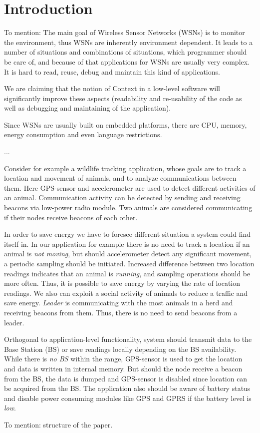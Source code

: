 \section{Introduction} To mention: The main goal of Wireless Sensor Networks
(WSNs) is to monitor the environment, thus WSNs are inherently environment
dependent. It leads to a number of situations and combinations of situations,
which programmer should be care of, and because of that applications for WSNs
are usually very complex. It is hard to read, reuse, debug and maintain this
kind of applications.

We are claiming that the notion of Context in a low-level software will
significantly improve these aspects (readability and re-usability of the code as
well as debugging and maintaining of the application).

Since WSNs are usually built on embedded platforms, there are CPU, memory,
energy consumption and even language restrictions.

...

Consider for example a wildlife tracking application\cite{pasztor10}, whose
goals are to track a location and movement of animals, and to analyze
communications between them. Here GPS-sensor and accelerometer are used to
detect different activities of an animal. Communication activity can be detected
by sending and receiving beacons via low-power radio module. Two animals are
considered communicating if their nodes receive beacons of each other.

In order to save energy we have to foresee different situation a system could
find itself in. In our application for example there is no need to track a
location if an animal is \emph{not moving}, but should accelerometer detect any
significant movement, a periodic sampling should be initiated. Increased
difference between two location readings indicates that an animal is
\emph{running}, and sampling operations should be more often. Thus, it is
possible to save energy by varying the rate of location readings. We also can
exploit a social activity of animals to reduce a traffic and save energy.
\emph{Leader} is communicating with the most animals in a herd and receiving
beacons from them. Thus, there is no need to send beacons from a leader.

Orthogonal to application-level functionality, system should transmit data to
the Base Station (BS) or save readings locally depending on the BS availability.
While there is \emph{no BS} within the range, GPS-sensor is used to get the
location and data is written in internal memory. But should the node receive a
beacon from the BS, the data is dumped and GPS-sensor is disabled since location
can be acquired from the BS. The application also should be aware of battery
status and disable power consuming modules like GPS and GPRS if the battery
level is \emph{low}.

To mention: structure of the paper.